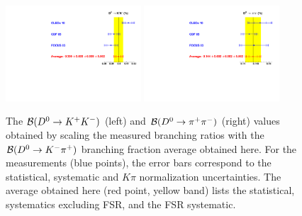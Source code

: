 
\begin{figure}
\begin{center}
\includegraphics[width=0.45\textwidth,angle=0.]{figures/charm/D0KK_2014.pdf}\hfill
\includegraphics[width=0.45\textwidth,angle=0.]{figures/charm/D0pipi_2014.pdf}
\caption{The ${\cal B}(D^0\to K^+K^-)$ (left) and ${\cal B}(D^0\to \pi^+\pi^-)$ (right) 
values obtained by scaling the measured branching ratios with the ${\cal B}(D^0\to K^-\pi^+)$ branching fraction
average obtained here.  For the measurements (blue points), the error bars correspond to the statistical, systematic
and $K\pi$ normalization uncertainties.  The average obtained here (red point, yellow band) lists the statistical,
systematics excluding FSR, and the FSR systematic.
\label{fig:kkpipi}}
\end{center}
\end{figure}

